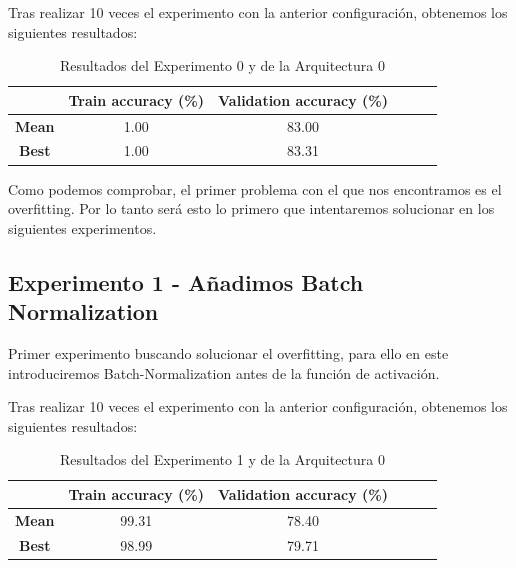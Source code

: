 \documentclass{article}
\begin{document}
			Tras realizar 10 veces el experimento con la anterior configuraci\'on, obtenemos los siguientes resultados:
			\begin{table}[!h]
				\begin{center}
					\begin{tabular}{ c | c | c | c | c | c |}
						\ & \textbf{Train accuracy (\%)} & \textbf{Validation accuracy (\%)}  \\ \hline
						\textbf{Mean} & 1.00 & 83.00 \\ \hline
						\textbf{Best} & 1.00 & 83.31 \\ \hline
					\end{tabular}
					\caption{Resultados del Experimento 0 y de la Arquitectura 0}
					\label{tab:res-j-a0-e0}
				\end{center}
			\end{table}
		    
		    Como podemos comprobar, el primer problema con el que nos encontramos es el overfitting. Por lo tanto ser\'a esto lo primero que intentaremos solucionar en los siguientes experimentos.

      \subsection{Experimento 1 - A\~{n}adimos Batch Normalization}
		\label{j-s-a0-e1} %
			Primer experimento buscando solucionar el overfitting, para ello en este introduciremos Batch-Normalization antes de la funci\'on de activaci\'on.
			
			
			Tras realizar 10 veces el experimento con la anterior configuraci\'on, obtenemos los siguientes resultados:
			\begin{table}[!h]
				\begin{center}
					\begin{tabular}{ c | c | c | c | c | c |}
						\ & \textbf{Train accuracy (\%)} & \textbf{Validation accuracy (\%)}  \\ \hline
						\textbf{Mean} & 99.31 & 78.40 \\ \hline
						\textbf{Best} & 98.99 & 79.71 \\ \hline
					\end{tabular}
					\caption{Resultados del Experimento 1 y de la Arquitectura 0}
					\label{tab:res-j-a0-e1}
				\end{center}
			\end{table}
		    
\end{document}
